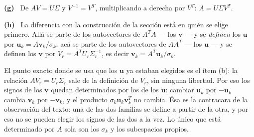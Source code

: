 \documentclass[11pt,a4paper]{article}
\newcommand{\bi}[1]{\boldsymbol{#1}}
\newcommand{\bu}{\bi{u}}  \newcommand{\bv}{\bi{v}}  \newcommand{\bw}{\bi{w}}
\newcommand{\itemsol}[1]{\par\medskip\noindent\textbf{(#1)}\ \ignorespaces}
\begin{document}
\itemsol{g} De $AV=U\Sigma$ y $V^{-1}=V^T$, multiplicando a derecha por $V^T$:
$A=U\Sigma V^{T}$.

\itemsol{h} La diferencia con la construcción de la sección está en quién se
elige primero. Allá se parte de los autovectores de $A^TA$ --- los $\bv$ --- y se
\emph{definen} los $\bu$ por $\bu_k=A\bv_k/\sigma_k$; acá se parte de los
autovectores de $AA^T$ --- los $\bu$ --- y se definen los $\bv$ por
$V_r=A^TU_r\Sigma_r^{-1}$, es decir $\bv_k=A^T\bu_k/\sigma_k$.

El punto exacto donde se usa que los $\bu$ ya estaban elegidos es el ítem (b): la
relación $AV_r=U_r\Sigma_r$ sale de la definición de $V_r$, sin ninguna libertad.
Por eso los signos de los $\bv$ quedan determinados por los de los $\bu$: cambiar
$\bu_k$ por $-\bu_k$ cambia $\bv_k$ por $-\bv_k$, y el producto
$\sigma_k\bu_k\bv_k^T$ no cambia. Ésa es la contracara de la observación del
texto: una de las dos familias se define a partir de la otra, y por eso no se
pueden elegir los signos de las dos a la vez. Lo único que está determinado por
$A$ sola son los $\sigma_k$ y los subespacios propios.
\end{document}
